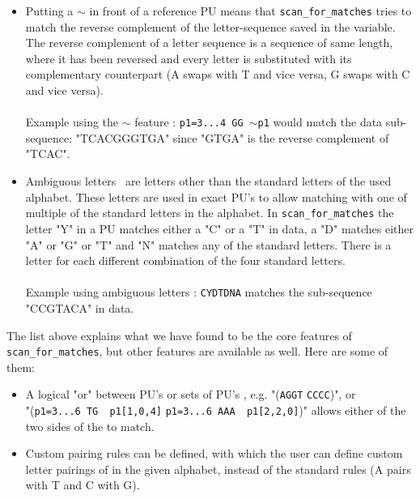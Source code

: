 \documentclass[12pt]{article}
\newcommand{\scm}{\texttt{scan\_for\_matches} }
\newcommand{\pu}{PU }
\newcommand{\pus}{PU's }
\begin{document}
\begin{itemize}
An example of each edit is shown in Figure 1. \\ \\
Example using single-letter edits : \texttt{p1=TGTGTCT[1,0,3]\; ATTCC[1,1,2]\; p1[2,2,2]} 
where the first exact \pu is allowed 1 mismatch, 0
deletions and 3 insertions, the middle exact \pu is allowed 1 mismatch, 1 deletion and 2 insertion 
and the reference \pu is allowed 2 of each.
\item Putting a $\sim$ in front of a reference \pu means that \scm tries to match the reverse 
complement of the letter-sequence saved in the variable. 
The reverse complement of a letter sequence is a sequence of same length, where it has been reversed and every letter
is substituted with its complementary counterpart (A swaps with T and vice versa, G swaps with C and vice versa).\\ \\
Example using the $\sim$ feature : \texttt{p1=3...4\; GG\; $\sim$p1} would match the data sub-sequence:
"TCACGGGTGA" since "GTGA" is the reverse complement of "TCAC".
\item Ambiguous letters~\cite{ambi} are letters other than the standard letters of the used alphabet. These letters are used
in exact \pus to allow matching with one of multiple of the standard letters in the alphabet.
In \scm the letter "Y" in a \pu matches either a "C" or a "T" in data, a "D" matches either "A" or "G" or "T" 
and "N" matches any of the standard letters. There is a letter for each different combination of the
four standard letters. \\ \\
Example using ambiguous letters : \texttt{CYDTDNA} matches the sub-sequence "CCGTACA" in data.
\end{itemize}
The list above explains what we have found to be the core features of \texttt{scan\_for\_matches}, 
but other features are available as well. Here are some of them: 
\begin{itemize}
\item A logical "or" between \pus or sets of \pus, e.g. "(\texttt{AGGT} \text{\textbar} \texttt{CCCC})", or  \\
"(\texttt{p1=3...6 TG ~p1[1,0,4]} \text{\textbar} \texttt{p1=3...6 AAA ~p1[2,2,0]})"
allows either of the two sides of the \text{\textbar} to match.
\item Custom pairing rules can be defined, with which the user can define custom letter pairings of in the given
alphabet, instead of the standard rules (A pairs with T and C with G). \\
\end{itemize}
\end{document}
